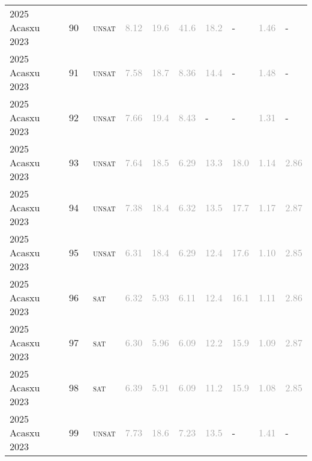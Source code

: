 \begin{center}
{\begin{longtable}{@{}llllllllll@{}}
2025 Acasxu 2023 & 90 & ~\textsc{unsat} & \textcolor{darkgray}{8.12} & \textcolor{darkgray}{19.6} & \textcolor{darkgray}{41.6} & \textcolor{darkgray}{18.2} & - & \textcolor{darkgray}{1.46} & - \\
2025 Acasxu 2023 & 91 & ~\textsc{unsat} & \textcolor{darkgray}{7.58} & \textcolor{darkgray}{18.7} & \textcolor{darkgray}{8.36} & \textcolor{darkgray}{14.4} & - & \textcolor{darkgray}{1.48} & - \\
2025 Acasxu 2023 & 92 & ~\textsc{unsat} & \textcolor{darkgray}{7.66} & \textcolor{darkgray}{19.4} & \textcolor{darkgray}{8.43} & - & - & \textcolor{darkgray}{1.31} & - \\
2025 Acasxu 2023 & 93 & ~\textsc{unsat} & \textcolor{darkgray}{7.64} & \textcolor{darkgray}{18.5} & \textcolor{darkgray}{6.29} & \textcolor{darkgray}{13.3} & \textcolor{darkgray}{18.0} & \textcolor{darkgray}{1.14} & \textcolor{darkgray}{2.86} \\
2025 Acasxu 2023 & 94 & ~\textsc{unsat} & \textcolor{darkgray}{7.38} & \textcolor{darkgray}{18.4} & \textcolor{darkgray}{6.32} & \textcolor{darkgray}{13.5} & \textcolor{darkgray}{17.7} & \textcolor{darkgray}{1.17} & \textcolor{darkgray}{2.87} \\
2025 Acasxu 2023 & 95 & ~\textsc{unsat} & \textcolor{darkgray}{6.31} & \textcolor{darkgray}{18.4} & \textcolor{darkgray}{6.29} & \textcolor{darkgray}{12.4} & \textcolor{darkgray}{17.6} & \textcolor{darkgray}{1.10} & \textcolor{darkgray}{2.85} \\
2025 Acasxu 2023 & 96 & ~\textsc{sat} & \textcolor{darkgray}{6.32} & \textcolor{darkgray}{5.93} & \textcolor{darkgray}{6.11} & \textcolor{darkgray}{12.4} & \textcolor{darkgray}{16.1} & \textcolor{darkgray}{1.11} & \textcolor{darkgray}{2.86} \\
2025 Acasxu 2023 & 97 & ~\textsc{sat} & \textcolor{darkgray}{6.30} & \textcolor{darkgray}{5.96} & \textcolor{darkgray}{6.09} & \textcolor{darkgray}{12.2} & \textcolor{darkgray}{15.9} & \textcolor{darkgray}{1.09} & \textcolor{darkgray}{2.87} \\
2025 Acasxu 2023 & 98 & ~\textsc{sat} & \textcolor{darkgray}{6.39} & \textcolor{darkgray}{5.91} & \textcolor{darkgray}{6.09} & \textcolor{darkgray}{11.2} & \textcolor{darkgray}{15.9} & \textcolor{darkgray}{1.08} & \textcolor{darkgray}{2.85} \\
2025 Acasxu 2023 & 99 & ~\textsc{unsat} & \textcolor{darkgray}{7.73} & \textcolor{darkgray}{18.6} & \textcolor{darkgray}{7.23} & \textcolor{darkgray}{13.5} & - & \textcolor{darkgray}{1.41} & - \\

\end{longtable}}
\end{center}
